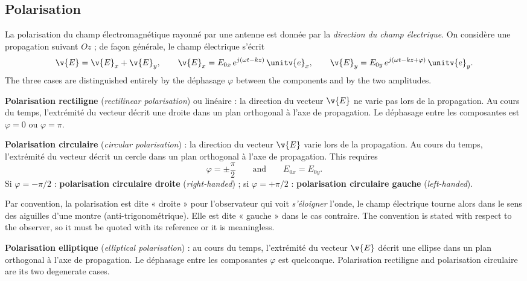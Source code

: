 \subsection{Polarisation}

La polarisation du champ électromagnétique rayonné par une antenne est donnée
par la \emph{direction du champ électrique}. On considère une propagation
suivant $Oz$ ; de façon générale, le champ électrique s'écrit
\[ \v{E} = \v{E}_x + \v{E}_y, \qquad
   \v{E}_x = E_{0x}\, e^{j(\omega t - kz)}\, \unitv{e}_x, \qquad
   \v{E}_y = E_{0y}\, e^{j(\omega t - kz + \varphi)}\, \unitv{e}_y. \]
The three cases are distinguished entirely by the déphasage $\varphi$ between
the components and by the two amplitudes.

\begin{definition}
  \textbf{Polarisation rectiligne} (\textit{rectilinear polarisation}) ou
  linéaire : la direction du vecteur $\v{E}$ ne varie pas lors de la
  propagation. Au cours du temps, l'extrémité du vecteur décrit une droite dans
  un plan orthogonal à l'axe de propagation. Le déphasage entre les composantes
  est $\varphi = 0$ ou $\varphi = \pi$.
\end{definition}

\begin{definition}
  \textbf{Polarisation circulaire} (\textit{circular polarisation}) : la
  direction du vecteur $\v{E}$ varie lors de la propagation. Au cours du temps,
  l'extrémité du vecteur décrit un cercle dans un plan orthogonal à l'axe de
  propagation. This requires
  \[ \varphi = \pm \frac{\pi}{2} \qquad\text{and}\qquad E_{0x} = E_{0y}. \]
  Si $\varphi = -\pi/2$ : \textbf{polarisation circulaire droite}
  (\textit{right-handed}) ; si $\varphi = +\pi/2$ : \textbf{polarisation
  circulaire gauche} (\textit{left-handed}).
\end{definition}

\begin{remark}
  Par convention, la polarisation est dite « droite » pour l'observateur qui
  voit \emph{s'éloigner} l'onde, le champ électrique tourne alors dans le sens
  des aiguilles d'une montre (anti-trigonométrique). Elle est dite « gauche »
  dans le cas contraire. The convention is stated with respect to the
  observer, so it must be quoted with its reference or it is meaningless.
\end{remark}

\begin{definition}
  \textbf{Polarisation elliptique} (\textit{elliptical polarisation}) : au
  cours du temps, l'extrémité du vecteur $\v{E}$ décrit une ellipse dans un
  plan orthogonal à l'axe de propagation. Le déphasage entre les composantes
  $\varphi$ est quelconque. Polarisation rectiligne and polarisation circulaire
  are its two degenerate cases.
\end{definition}

